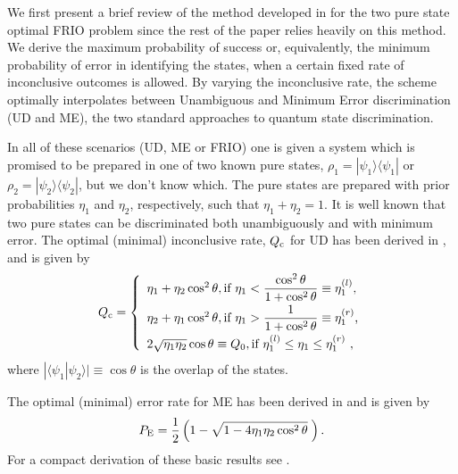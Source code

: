 \documentclass[aps,pra,twocolumn,eqsecnum,showpacs]{revtex4}
\newcommand{\br}[1]{\langle #1|}
\newcommand{\ke}[1]{|#1\rangle}
\begin{document}
We first present a brief review of the method developed in \cite{Bagan} for the two pure state optimal FRIO problem since the rest of the paper relies heavily on this method.  We derive the maximum probability of success or, equivalently, the minimum probability of error in identifying the states, when a certain fixed rate of inconclusive outcomes is allowed. By varying the inconclusive rate, the scheme optimally interpolates between Unambiguous and Minimum Error discrimination (UD and ME), the two standard approaches to quantum state discrimination.

In all of these scenarios (UD, ME or FRIO) one is given a system which is promised to be prepared in one of two known pure states, $\rho_1= \ke {\psi_1} \br {\psi_1}$ or $\rho_2 = \ke {\psi_2} \br{\psi_2}$, but we don't know which. The pure states are prepared with prior probabilities $\eta_1$ and $\eta_2$, respectively, such that $\eta_1 +\eta_2 = 1$. It is well known that two pure states can be discriminated both unambiguously and with minimum error.  The optimal (minimal) inconclusive rate, $Q_{\rm c}$ for UD has been derived in \cite{ivanovic,dieks,peres,jaeger}, and is given by
\begin{equation}
    \label{Qmax}
    Q_{\rm c} = \left\{ \begin{array}{l}
     \eta_{1}+\eta_{2}\cos^{2}\theta, \mbox{if $\displaystyle \eta_{1} <
    \frac{\cos^{2}\theta}{1+\cos^{2}\theta}\equiv\eta_1^{(l)} $,}  \\ [.7em]
    \eta_{2}+\eta_{1}\cos^{2}\theta, \mbox{if $\eta_1>\displaystyle \frac{1}{1+\cos^{2}\theta}
    \equiv\eta_{1}^{(r)}$,}\\[.7em] 
   2\sqrt{\eta_{1}\eta_{2}}\cos\theta\equiv Q_0, \mbox{if $\eta_1^{(l)}\le\eta_1\le\eta_1^{(r)}$}\ ,
    \end{array}
    \right. 
\end{equation}
where $|\langle\psi_{1}|\psi_{2}\rangle| \equiv \cos \theta$ is the overlap of the states.

The optimal (minimal) error rate for ME has been derived in \cite{helstrom} and is given by
\begin{equation}
P_{\rm E}=\frac{1}{2}\left(1-\sqrt{1-4\eta_1\eta_2\cos^{2}\theta}\;\right).
\label{PE}
\end{equation}
For a compact derivation of these basic results see \cite{bergourev}.
\end{document}
